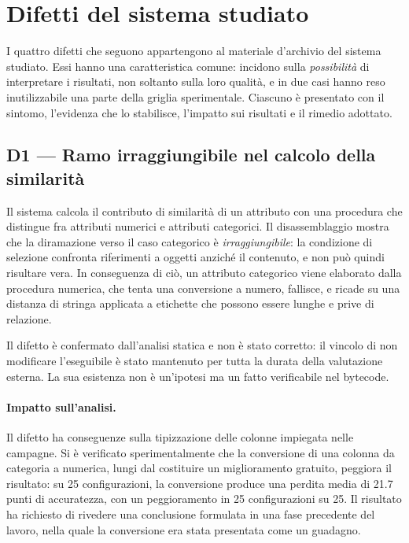 \section{Difetti del sistema studiato}\label{sec:defects-system}

I quattro difetti che seguono appartengono al materiale d'archivio del sistema studiato. Essi hanno
una caratteristica comune: incidono sulla \emph{possibilità} di interpretare i risultati, non
soltanto sulla loro qualità, e in due casi hanno reso inutilizzabile una parte della griglia
sperimentale. Ciascuno è presentato con il sintomo, l'evidenza che lo stabilisce, l'impatto sui
risultati e il rimedio adottato.

\subsection{D1 --- Ramo irraggiungibile nel calcolo della similarità}\label{sec:d1}

Il sistema calcola il contributo di similarità di un attributo con una procedura che distingue
fra attributi numerici e attributi categorici. Il disassemblaggio mostra che la diramazione verso
il caso categorico è \emph{irraggiungibile}: la condizione di selezione confronta riferimenti a
oggetti anziché il contenuto, e non può quindi risultare vera. In conseguenza di ciò, un attributo
categorico viene elaborato dalla procedura numerica, che tenta una conversione a numero, fallisce,
e ricade su una distanza di stringa applicata a etichette che possono essere lunghe e prive di
relazione.

\begin{observation}
Il difetto è confermato dall'analisi statica e non è stato corretto: il vincolo di non modificare
l'eseguibile è stato mantenuto per tutta la durata della valutazione esterna. La sua esistenza
non è un'ipotesi ma un fatto verificabile nel bytecode.
\end{observation}

\paragraph{Impatto sull'analisi.} Il difetto ha conseguenze sulla tipizzazione delle colonne
impiegata nelle campagne. Si è verificato sperimentalmente che la conversione di una colonna da
categoria a numerica, lungi dal costituire un miglioramento gratuito, peggiora il risultato:
su \num{25} configurazioni, la conversione produce una perdita media di \SI{21.7}{} punti di
accuratezza, con un peggioramento in \num{25} configurazioni su \num{25}. Il risultato ha
richiesto di rivedere una conclusione formulata in una fase precedente del lavoro, nella quale la
conversione era stata presentata come un guadagno.

